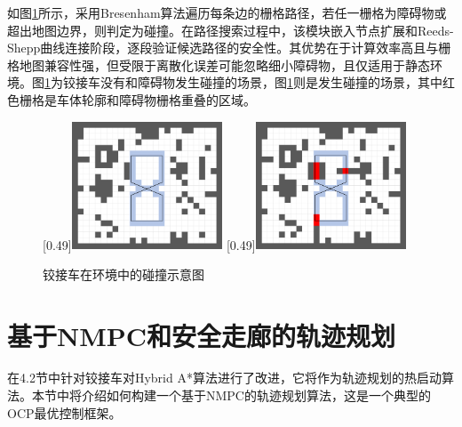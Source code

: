 \documentclass[master,academic]{ysuthesis} %
\begin{document}
		如图\ref{fig:障碍物检测图}所示，采用Bresenham算法遍历每条边的栅格路径，若任一栅格为障碍物或超出地图边界，则判定为碰撞。在路径搜索过程中，该模块嵌入节点扩展和Reeds-Shepp曲线连接阶段，逐段验证候选路径的安全性。其优势在于计算效率高且与栅格地图兼容性强，但受限于离散化误差可能忽略细小障碍物，且仅适用于静态环境。图\ref{fig:障碍物检测图}为铰接车没有和障碍物发生碰撞的场景，图\ref{fig:障碍物检测图}则是发生碰撞的场景，其中红色栅格是车体轮廓和障碍物栅格重叠的区域。
		\begin{figure}[H]
			\centering
			[0.49\textwidth]{\includegraphics[width=0.4\textwidth]{bresham_free.png}}
			[0.49\textwidth]{\includegraphics[width=0.4\textwidth]{bresham_colli.png}}
			\caption{铰接车在环境中的碰撞示意图}
			\label{fig:障碍物检测图}
		\end{figure}

	\section{基于NMPC和安全走廊的轨迹规划}
	在4.2节中针对铰接车对Hybrid A*算法进行了改进，它将作为轨迹规划的热启动算法。本节中将介绍如何构建一个基于NMPC的轨迹规划算法，这是一个典型的OCP最优控制框架。
\end{document}
